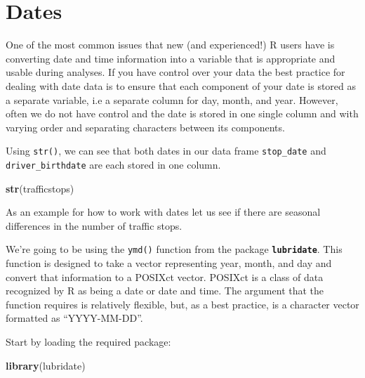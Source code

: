 \documentclass[]{book}
\newenvironment{Shaded}{\begin{snugshade}}{\end{snugshade}}
\newcommand{\KeywordTok}[1]{\textcolor[rgb]{0.13,0.29,0.53}{\textbf{{#1}}}}
\newcommand{\StringTok}[1]{\textcolor[rgb]{0.31,0.60,0.02}{{#1}}}
\newcommand{\CommentTok}[1]{\textcolor[rgb]{0.56,0.35,0.01}{\textit{{#1}}}}
\newcommand{\NormalTok}[1]{{#1}}
\theoremstyle{definition}
\theoremstyle{definition}
\theoremstyle{remark}
\begin{document}
\section{Dates}\label{dates}

One of the most common issues that new (and experienced!) R users have
is converting date and time information into a variable that is
appropriate and usable during analyses. If you have control over your
data the best practice for dealing with date data is to ensure that each
component of your date is stored as a separate variable, i.e a separate
column for day, month, and year. However, often we do not have control
and the date is stored in one single column and with varying order and
separating characters between its components.

Using \texttt{str()}, we can see that both dates in our data frame
\texttt{stop\_date} and \texttt{driver\_birthdate} are each stored in
one column.

\begin{Shaded}
\begin{Highlighting}[]
\KeywordTok{str}\NormalTok{(trafficstops)}
\end{Highlighting}
\end{Shaded}

As an example for how to work with dates let us see if there are
seasonal differences in the number of traffic stops.

We're going to be using the \texttt{ymd()} function from the package
\textbf{\texttt{lubridate}}. This function is designed to take a vector
representing year, month, and day and convert that information to a
POSIXct vector. POSIXct is a class of data recognized by R as being a
date or date and time. The argument that the function requires is
relatively flexible, but, as a best practice, is a character vector
formatted as ``YYYY-MM-DD''.

Start by loading the required package:

\begin{Shaded}
\begin{Highlighting}[]
\KeywordTok{library}\NormalTok{(lubridate)}
\end{Highlighting}
\end{Shaded}

\begin{Shaded}
\end{Shaded}
\end{document}

